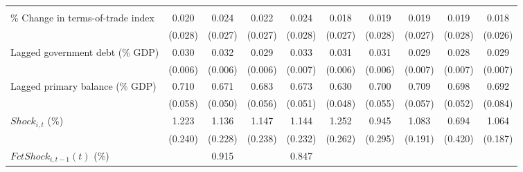 {\begin{tabular}{l*{9}{c}}
                    &                     &                     &                     &                     &                     &                     &                     &                     &                     \\
\addlinespace
\% Change in terms-of-trade index&       0.020         &       0.024         &       0.022         &       0.024         &       0.018         &       0.019         &       0.019         &       0.019         &       0.018         \\
                    &     (0.028)         &     (0.027)         &     (0.027)         &     (0.028)         &     (0.027)         &     (0.028)         &     (0.027)         &     (0.028)         &     (0.026)         \\
\addlinespace
Lagged government debt (\% GDP)&       0.030\sym{***}&       0.032\sym{***}&       0.029\sym{***}&       0.033\sym{***}&       0.031\sym{***}&       0.031\sym{***}&       0.029\sym{***}&       0.028\sym{***}&       0.029\sym{***}\\
                    &     (0.006)         &     (0.006)         &     (0.006)         &     (0.007)         &     (0.006)         &     (0.006)         &     (0.007)         &     (0.007)         &     (0.007)         \\
\addlinespace
Lagged primary balance (\% GDP)&       0.710\sym{***}&       0.671\sym{***}&       0.683\sym{***}&       0.673\sym{***}&       0.630\sym{***}&       0.700\sym{***}&       0.709\sym{***}&       0.698\sym{***}&       0.692\sym{***}\\
                    &     (0.058)         &     (0.050)         &     (0.056)         &     (0.051)         &     (0.048)         &     (0.055)         &     (0.057)         &     (0.052)         &     (0.084)         \\
\addlinespace
$ Shock_{i,t}$ (\%) &       1.223\sym{***}&       1.136\sym{***}&       1.147\sym{***}&       1.144\sym{***}&       1.252\sym{***}&       0.945\sym{***}&       1.083\sym{***}&       0.694         &       1.064\sym{***}\\
                    &     (0.240)         &     (0.228)         &     (0.238)         &     (0.232)         &     (0.262)         &     (0.295)         &     (0.191)         &     (0.420)         &     (0.187)         \\
\addlinespace
$ FctShock_{i,t-1}(t)$ (\%)&                     &       0.915\sym{**} &                     &       0.847\sym{**} &                     &                     &                     &                     &                     \\

\end{tabular}}
